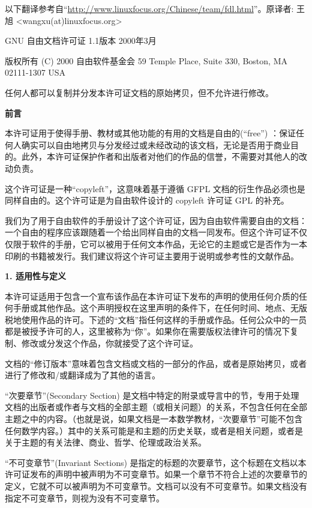 \ifdefined\chs
以下翻译参考自``\url{http://www.linuxfocus.org/Chinese/team/fdl.html}''。原译者: 王旭 <wangxu(at)linuxfocus.org>

GNU 自由文档许可证 1.1版本 2000年3月

版权所有 (C) 2000 自由软件基金会 59 Temple Place, Suite 330, Boston, MA 02111-1307 USA 

任何人都可以复制并分发本许可证文档的原始拷贝，但不允许进行修改。


\begin{center}
{\bf\large 前言}
\end{center}

本许可证用于使得手册、教材或其他功能的有用的文档是自由的(``free'') ：保证任何人确实可以自由地拷贝与分发经过或未经改动的该文档，无论是否用于商业目的。此外，本许可证保护作者和出版者对他们的作品的信誉，不需要对其他人的改动负责。


这个许可证是一种``copyleft''，这意味着基于遵循 GFPL 文档的衍生作品必须也是同样自由的。这个许可证是为自由软件设计的 copyleft 许可证 GPL 的补充。


我们为了用于自由软件的手册设计了这个许可证，因为自由软件需要自由的文档：一个自由的程序应该跟随着一个给出同样自由的文档一同发布。但这个许可证不仅仅限于软件的手册，它可以被用于任何文本作品，无论它的主题或它是否作为一本印刷的书籍被发行。我们建议将这个许可证主要用于说明或参考性的文献作品。


\begin{center}
{\Large\bf 1. 适用性与定义\par}
\end{center}

本许可证适用于包含一个宣布该作品在本许可证下发布的声明的使用任何介质的任何手册或其他作品。这个声明授权在这里声明的条件下，在任何时间、地点、无版税地使用作品的许可。下述的``文档''指任何这样的手册或作品。任何公众中的一员都是被授予许可的人，这里被称为``你''。如果你在需要版权法律许可的情况下复制、修改或分发这个作品，你就接受了这个许可证。

文档的``修订版本''意味着包含文档或文档的一部分的作品，或者是原始拷贝，或者进行了修改和/或翻译成为了其他的语言。

``次要章节''(Secondary Section) 是文档中特定的附录或导言中的节，专用于处理文档的出版者或作者与文档的全部主题（或相关问题）的关系，不包含任何在全部主题之中的内容。（也就是说，如果文档是一本数学教材，``次要章节''可能不包含任何数学内容。）其中的关系可能是和主题的历史关联，或者是相关问题，或者是关于主题的有关法律、商业、哲学、伦理或政治关系。

``不可变章节''(Invariant Sections) 是指定的标题的次要章节，这个标题在文档以本许可证发布的声明中被声明为不可变章节。如果一个章节不符合上述的次要章节的定义，它就不可以被声明为不可变章节。文档可以没有不可变章节。如果文档没有指定不可变章节，则视为没有不可变章节。

